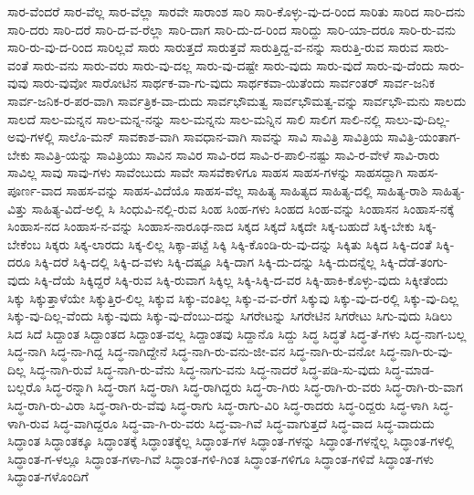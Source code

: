 {ಸಾರ-ವೆಂದರೆ
ಸಾರ-ವೆಲ್ಲ
ಸಾರ-ವೆಲ್ಲಾ
ಸಾರವೇ
ಸಾರಾಂಶ
ಸಾರಿ
ಸಾರಿ-ಕೊಳ್ಳು-ವು-ದ-ರಿಂದ
ಸಾರಿತು
ಸಾರಿದ
ಸಾರಿ-ದನು
ಸಾರಿ-ದರು
ಸಾರಿ-ದರೆ
ಸಾರಿ-ದ-ವ-ರೆಲ್ಲಾ
ಸಾರಿ-ದಾಗ
ಸಾರಿ-ದು-ದ-ರಿಂದ
ಸಾರಿದ್ದು
ಸಾರಿ-ಯಾ-ದರೂ
ಸಾರಿ-ರು-ವನು
ಸಾರಿ-ರು-ವು-ದ-ರಿಂದ
ಸಾರಿಲ್ಲವೆ
ಸಾರು
ಸಾರುತ್ತದೆ
ಸಾರುತ್ತವೆ
ಸಾರುತ್ತಿದ್ದ-ವ-ನನ್ನು
ಸಾರುತ್ತಿ-ರುವ
ಸಾರುವ
ಸಾರು-ವಂತೆ
ಸಾರು-ವನು
ಸಾರು-ವರು
ಸಾರು-ವು-ದಲ್ಲ
ಸಾರು-ವು-ದಷ್ಟೇ
ಸಾರು-ವುದು
ಸಾರು-ವುದೆ
ಸಾರು-ವು-ದೆಂದು
ಸಾರು-ವುವು
ಸಾರು-ವುವೋ
ಸಾರೋಟಿನ
ಸಾರ್ಥಕ-ವಾ-ಗು-ವುದು
ಸಾರ್ಥಕವಾ-ಯಿತೆಂದು
ಸಾರ್ವಂತರ್
ಸಾರ್ವ-ಜನಿಕ
ಸಾರ್ವ-ಜನಿಕ-ರ-ಪರ-ವಾಗಿ
ಸಾರ್ವತ್ರಿಕ-ವಾ-ದುದು
ಸಾರ್ವಭೌಮತ್ವ
ಸಾರ್ವಭೌಮತ್ವ-ವನ್ನು
ಸಾರ್ವಭೌ-ಮನು
ಸಾಲದು
ಸಾಲದೆ
ಸಾಲ-ಮನ್ನನ
ಸಾಲ-ಮನ್ನ-ನನ್ನು
ಸಾಲ-ಮನ್ನನು
ಸಾಲ-ಮನ್ನಿನ
ಸಾಲಿ
ಸಾಲಿಗ
ಸಾಲಿ-ನಲ್ಲಿ
ಸಾಲು-ವು-ದಿಲ್ಲ-ಅವು-ಗಳಲ್ಲಿ
ಸಾಲೊ-ಮನ್
ಸಾವಕಾಶ-ವಾಗಿ
ಸಾವಧಾನ-ವಾಗಿ
ಸಾವನ್ನು
ಸಾವಿ
ಸಾವಿತ್ರಿ
ಸಾವಿತ್ರಿಯ
ಸಾವಿತ್ರಿ-ಯಂತಾಗ-ಬೇಕು
ಸಾವಿತ್ರಿ-ಯನ್ನು
ಸಾವಿತ್ರಿಯು
ಸಾವಿನ
ಸಾವಿರ
ಸಾವಿ-ರದ
ಸಾವಿ-ರ-ಪಾಲಿ-ನಷ್ಟು
ಸಾವಿ-ರ-ವೇಳೆ
ಸಾವಿ-ರಾರು
ಸಾವಿಲ್ಲ
ಸಾವು
ಸಾವು-ಗಳು
ಸಾವೆಂಬುದು
ಸಾವೇ
ಸಾಸವೆಕಾಳಿಗೂ
ಸಾಹಸ
ಸಾಹಸ-ಗಳನ್ನು
ಸಾಹಸದ್ದಾಗಿ
ಸಾಹಸ-ಪೂರ್ಣ-ವಾದ
ಸಾಹಸ-ವನ್ನು
ಸಾಹಸ-ವಿದೆಯೊ
ಸಾಹಸ-ವೆಲ್ಲ
ಸಾಹಿತ್ಯ
ಸಾಹಿತ್ಯದ
ಸಾಹಿತ್ಯ-ದಲ್ಲಿ
ಸಾಹಿತ್ಯ-ರಾಶಿ
ಸಾಹಿತ್ಯ-ವಿತ್ತು
ಸಾಹಿತ್ಯ-ವಿದೆ-ಅಲ್ಲಿ
ಸಿ
ಸಿಂಧುವಿ-ನಲ್ಲಿ-ರುವ
ಸಿಂಹ
ಸಿಂಹ-ಗಳು
ಸಿಂಹದ
ಸಿಂಹ-ವನ್ನು
ಸಿಂಹಾಸನ
ಸಿಂಹಾಸ-ನಕ್ಕೆ
ಸಿಂಹಾಸ-ನದ
ಸಿಂಹಾಸ-ನ-ವನ್ನು
ಸಿಂಹಾಸ-ನಾರೂಢ-ನಾದ
ಸಿಕ್ಕದ
ಸಿಕ್ಕದೆ
ಸಿಕ್ಕದೇ
ಸಿಕ್ಕ-ಬಹುದೆ
ಸಿಕ್ಕ-ಬೇಕು
ಸಿಕ್ಕ-ಬೇಕೆಂಬ
ಸಿಕ್ಕರು
ಸಿಕ್ಕ-ಲಾರದು
ಸಿಕ್ಕ-ಲಿಲ್ಲ
ಸಿಕ್ಕಾ-ಪಟ್ಟೆ
ಸಿಕ್ಕಿ
ಸಿಕ್ಕಿ-ಕೊಂಡಿ-ರು-ವು-ದನ್ನು
ಸಿಕ್ಕಿತು
ಸಿಕ್ಕಿದ
ಸಿಕ್ಕಿ-ದಂತೆ
ಸಿಕ್ಕಿ-ದರೂ
ಸಿಕ್ಕಿ-ದರೆ
ಸಿಕ್ಕಿ-ದಲ್ಲಿ
ಸಿಕ್ಕಿ-ದ-ವಳು
ಸಿಕ್ಕಿ-ದಷ್ಟೂ
ಸಿಕ್ಕಿ-ದಾಗ
ಸಿಕ್ಕಿ-ದು-ದನ್ನು
ಸಿಕ್ಕಿ-ದುದನ್ನೆಲ್ಲ
ಸಿಕ್ಕಿ-ದೆಡೆ-ತಂಗು-ವುದು
ಸಿಕ್ಕಿ-ದೆಯೆ
ಸಿಕ್ಕಿದ್ದರೆ
ಸಿಕ್ಕಿ-ರುವ
ಸಿಕ್ಕಿ-ರುವಾಗ
ಸಿಕ್ಕಿಲ್ಲ
ಸಿಕ್ಕಿ-ಸಿಕ್ಕಿ-ದ-ವರ
ಸಿಕ್ಕಿ-ಹಾಕಿ-ಕೊಳ್ಳು-ವುದು
ಸಿಕ್ಕೀತೆಂದು
ಸಿಕ್ಕು
ಸಿಕ್ಕುತ್ತಾಳೆಯೇ
ಸಿಕ್ಕುತ್ತಿರ-ಲಿಲ್ಲ
ಸಿಕ್ಕುವ
ಸಿಕ್ಕು-ವಂತಿಲ್ಲ
ಸಿಕ್ಕು-ವ-ವ-ರೆಗೆ
ಸಿಕ್ಕುವು
ಸಿಕ್ಕು-ವು-ದ-ರಲ್ಲಿ
ಸಿಕ್ಕು-ವು-ದಿಲ್ಲ
ಸಿಕ್ಕು-ವು-ದಿಲ್ಲ-ವೆಂದು
ಸಿಕ್ಕು-ವುದು
ಸಿಕ್ಕು-ವು-ದೆಂಬು-ದನ್ನು
ಸಿಗರೇಟನ್ನು
ಸಿಗರೇಟಿನ
ಸಿಗರೇಟು
ಸಿಗು-ವುದು
ಸಿಡಿಲು
ಸಿದ
ಸಿದೆ
ಸಿದ್ದಾಂತ
ಸಿದ್ದಾಂತದ
ಸಿದ್ದಾಂತ-ವಲ್ಲ
ಸಿದ್ದಾಂತವು
ಸಿದ್ದಾನೊ
ಸಿದ್ದು
ಸಿದ್ಧ
ಸಿದ್ಧತೆ
ಸಿದ್ಧ-ತೆ-ಗಳು
ಸಿದ್ಧ-ನಾಗ-ಬಲ್ಲ
ಸಿದ್ಧ-ನಾಗಿ
ಸಿದ್ಧ-ನಾ-ಗಿದ್ದ
ಸಿದ್ಧ-ನಾಗಿದ್ದೇನೆ
ಸಿದ್ಧ-ನಾಗಿ-ರು-ವನು-ಜೀ-ವನ
ಸಿದ್ಧ-ನಾಗಿ-ರು-ವನೋ
ಸಿದ್ಧ-ನಾಗಿ-ರು-ವು-ದಿಲ್ಲ
ಸಿದ್ಧ-ನಾಗಿ-ರುವೆ
ಸಿದ್ಧ-ನಾಗಿ-ರು-ವೆನು
ಸಿದ್ಧ-ನಾಗು-ವನು
ಸಿದ್ಧ-ನಾದರೆ
ಸಿದ್ಧ-ಪಡಿ-ಸು-ವುದು
ಸಿದ್ಧ-ಮಾಡ-ಬಲ್ಲರೊ
ಸಿದ್ಧ-ರನ್ನಾಗಿ
ಸಿದ್ಧ-ರಾಗ
ಸಿದ್ಧ-ರಾಗಿ
ಸಿದ್ಧ-ರಾಗಿದ್ದರು
ಸಿದ್ಧ-ರಾ-ಗಿರು
ಸಿದ್ಧ-ರಾಗಿ-ರು-ವರು
ಸಿದ್ಧ-ರಾಗಿ-ರು-ವಾಗ
ಸಿದ್ಧ-ರಾಗಿ-ರು-ವಿರಾ
ಸಿದ್ಧ-ರಾಗಿ-ರು-ವೆವು
ಸಿದ್ಧ-ರಾಗು
ಸಿದ್ಧ-ರಾಗು-ವಿರಿ
ಸಿದ್ಧ-ರಾದರು
ಸಿದ್ಧ-ರಿದ್ದರು
ಸಿದ್ಧ-ಳಾಗಿ
ಸಿದ್ಧ-ಳಾಗಿ-ರುವ
ಸಿದ್ಧ-ವಾಗಿದ್ದರೂ
ಸಿದ್ಧ-ವಾ-ಗಿ-ರು-ವರು
ಸಿದ್ಧ-ವಾ-ಗಿವೆ
ಸಿದ್ಧ-ವಾಗುತ್ತದೆ
ಸಿದ್ಧ-ವಾದ
ಸಿದ್ಧ-ವಾದುದು
ಸಿದ್ಧಾಂತ
ಸಿದ್ಧಾಂತಕ್ಕೂ
ಸಿದ್ಧಾಂತಕ್ಕೆ
ಸಿದ್ಧಾಂತಕ್ಕೆಲ್ಲ
ಸಿದ್ಧಾಂತ-ಗಳ
ಸಿದ್ಧಾಂತ-ಗಳನ್ನು
ಸಿದ್ಧಾಂತ-ಗಳನ್ನೆಲ್ಲ
ಸಿದ್ಧಾಂತ-ಗಳಲ್ಲಿ
ಸಿದ್ಧಾಂತ-ಗ-ಳಲ್ಲೂ
ಸಿದ್ಧಾಂತ-ಗಳಾ-ಗಿವೆ
ಸಿದ್ಧಾಂತ-ಗಳಿ-ಗಿಂತ
ಸಿದ್ಧಾಂತ-ಗಳಿಗೂ
ಸಿದ್ಧಾಂತ-ಗಳಿವೆ
ಸಿದ್ಧಾಂತ-ಗಳು
ಸಿದ್ಧಾಂತ-ಗಳೊಂದಿಗೆ
}
